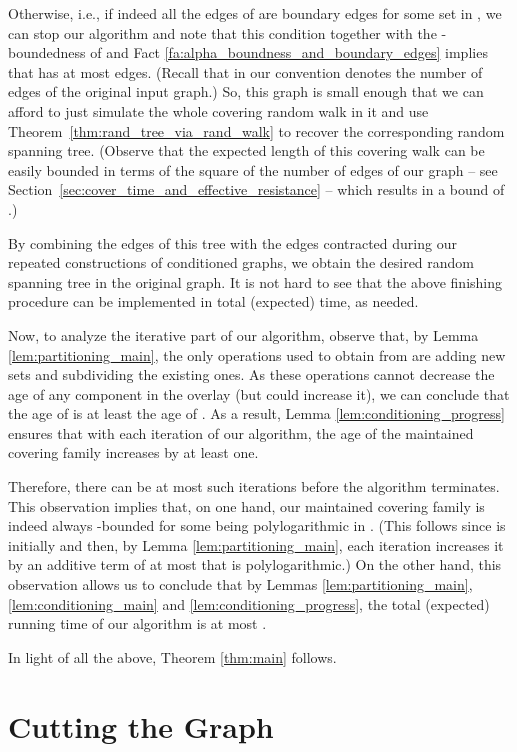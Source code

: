 \documentclass[11pt, letterpaper]{article}
\begin{document}
Otherwise, i.e., if indeed all the edges of  are boundary edges for some set in , we can stop our algorithm and note that this condition together with the -boundedness of  and Fact \ref{fa:alpha_boundness_and_boundary_edges} implies that  has at most  edges. (Recall that in our convention  denotes the number of edges of the original input graph.) So, this graph is small enough that we can afford to just simulate the whole covering random walk in it and use Theorem~\ref{thm:rand_tree_via_rand_walk} to recover the corresponding random spanning tree. (Observe that the expected length of this covering walk can be easily bounded in terms of the square of the number of edges of our graph -- see Section~\ref{sec:cover_time_and_effective_resistance} -- which results in a bound of .) 

By combining the edges of this tree with the edges contracted during our repeated constructions of conditioned graphs, we obtain the desired random spanning tree in the original graph. It is not hard to see that the above finishing procedure can be implemented in total  (expected) time, as needed.

Now, to analyze the iterative part of our algorithm, observe that, by Lemma \ref{lem:partitioning_main}, the only operations used to obtain  from  are adding new sets and subdividing the existing ones. As these operations cannot decrease the age of any component in the overlay (but could increase it), we can conclude that the age of  is at least the age of . As a result, Lemma \ref{lem:conditioning_progress} ensures that with each iteration of our algorithm, the age of the maintained covering family  increases by at least one. 

Therefore, there can be at most  such iterations before the algorithm terminates. This observation implies that, on one hand, our maintained covering family  is indeed always -bounded for some  being polylogarithmic in . (This follows since  is initially  and then, by Lemma \ref{lem:partitioning_main}, each iteration increases it by an additive term of at most  that is polylogarithmic.) On the other hand, this observation allows us to conclude that by Lemmas \ref{lem:partitioning_main}, \ref{lem:conditioning_main} and \ref{lem:conditioning_progress}, the total (expected) running time of our algorithm is at most . 

In light of all the above, Theorem \ref{thm:main} follows.



 \section{Cutting the Graph} \label{sec:parititioning}
\end{document}
